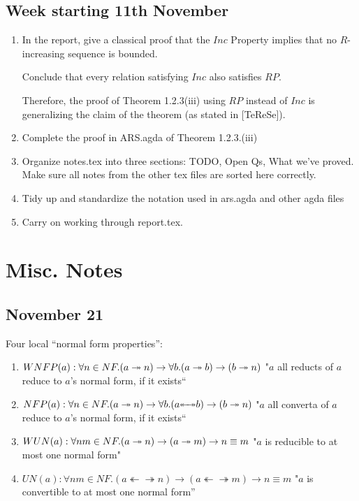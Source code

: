 \documentclass{scrartcl}
\newcommand{\cmark}{\quad\ding{51}}%
\newcommand{\thra}{\twoheadrightarrow}
\newcommand{\thla}{\twoheadleftarrow}
\newcommand{\thlra}{{\thla\!\!\thra}}
\begin{document}
\subsection*{Week starting 11th November}
\begin{enumerate}
  \item[\cmark] In the report, give a classical proof that the $Inc$ Property
  implies that no $R$-increasing sequence is bounded.

  Conclude that every relation satisfying $Inc$ also satisfies $RP$.

  Therefore, the proof of Theorem 1.2.3(iii) using $RP$ instead of $Inc$
  is generalizing the claim of the theorem (as stated in [TeReSe]).
  \item Complete the proof in ARS.agda of Theorem 1.2.3.(iii)
  \item Organize notes.tex into three sections: TODO, Open Qs, What we've proved. Make sure all notes from the other
  tex files are sorted here correctly.
  \item Tidy up and standardize the notation used in ars.agda and other agda files
  \item Carry on working through report.tex.
\end{enumerate}

\newpage

\section{Misc. Notes}


\subsection*{November 21}
Four local ``normal form properties'':
\begin{enumerate}
  \item $WNFP(a) : \forall n \in NF. (a \twoheadrightarrow n) \to \forall b. (a \twoheadrightarrow b) \to (b \twoheadrightarrow n)$
    "$a$ all reducts of $a$ reduce to $a$'s normal form, if it exists``
  \item $NFP(a) : \forall n \in NF. (a \tto n) \to \forall b. (a \thlra b) \to (b \tto n)$
    "$a$ all converta of $a$ reduce to $a$'s normal form, if it exists``
  \item $WUN(a) : \forall n m \in NF. (a \twoheadrightarrow n) \to (a \twoheadrightarrow m) \to n \equiv m$
    "$a$ is reducible to at most one normal form"
  \item $UN(a) : \forall n m \in NF. (a \thlra n) \to (a \thlra m) \to n \equiv m$
    "$a$ is convertible to at most one normal form''
\end{enumerate}
\end{document}
